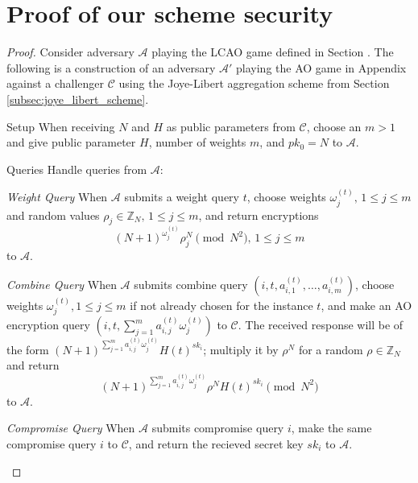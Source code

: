 \documentclass[10pt,letterpaper,oneside,twocolumn,journal]{IEEEtran}
\theoremstyle{definition}
\theoremstyle{definition}
\theoremstyle{remark}
\begin{document}
\section{Proof of our scheme security} \label{app:proof}
\begin{proof}
    Consider adversary $\mathcal{A}$ playing the LCAO game defined in Section . The following is a construction of an adversary $\mathcal{A}'$ playing the AO game in Appendix  against a challenger $\mathcal{C}$ using the Joye-Libert aggregation scheme from Section \ref{subsec:joye_libert_scheme}.
    \begin{LaTeXdescription}
        \item[Setup] When receiving $N$ and $H$ as public parameters from $\mathcal{C}$, choose an $m>1$ and give public parameter $H$, number of weights $m$, and $pk_0=N$ to $\mathcal{A}$.
        \item[Queries] Handle queries from $\mathcal{A}$:
        \begin{LaTeXdescription}
            \item[\textit{Weight Query}] When $\mathcal{A}$ submits a weight query $t$, choose weights $\omega^{(t)}_j,\,1 \leq j \leq m$ and random values $\rho_j \in \mathbb{Z}_N,\,1 \leq j \leq m$, and return encryptions 
            \begin{equation*}
                (N+1)^{\omega^{(t)}_{j}}\rho_j^N\pmod{N^2},\,1\leq j\leq m
            \end{equation*}
            to $\mathcal{A}$.
            \item[\textit{Combine Query}] When $\mathcal{A}$ submits combine query $(i, t, a^{(t)}_{i,1},\dots,a^{(t)}_{i,m})$, choose weights $\omega^{(t)}_j,1 \leq j \leq m$ if not already chosen for the instance $t$, and make an AO encryption query $(i, t, \sum^m_{j=1}a^{(t)}_{i,j}\omega^{(t)}_j)$ to $\mathcal{C}$. The received response will be of the form $(N+1)^{\sum^m_{j=1}a^{(t)}_{i,j}\omega^{(t)}_j}H(t)^{sk_i}$; multiply it by $\rho^N$ for a random $\rho \in \mathbb{Z}_N$ and return 
            \begin{equation*}
                (N+1)^{\sum^m_{j=1}a^{(t)}_{i,j}\omega^{(t)}_j}\rho^N H(t)^{sk_i} \pmod{N^2}
            \end{equation*}
            to $\mathcal{A}$.
            \item[\textit{Compromise Query}] When $\mathcal{A}$ submits compromise query $i$, make the same compromise query $i$ to $\mathcal{C}$, and return the recieved secret key $sk_i$ to $\mathcal{A}$.
        \end{LaTeXdescription}

\end{LaTeXdescription}
\end{proof}
\end{document}
